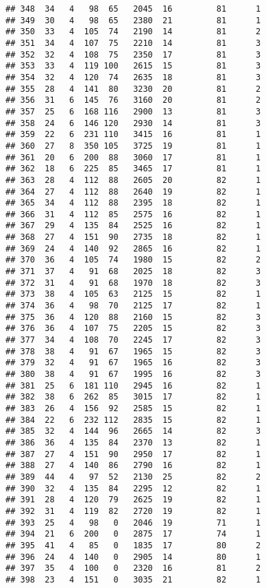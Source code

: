 \documentclass[]{article}
\begin{document}
\begin{verbatim}
## 348  34   4   98  65   2045  16         81      1
## 349  30   4   98  65   2380  21         81      1
## 350  33   4  105  74   2190  14         81      2
## 351  34   4  107  75   2210  14         81      3
## 352  32   4  108  75   2350  17         81      3
## 353  33   4  119 100   2615  15         81      3
## 354  32   4  120  74   2635  18         81      3
## 355  28   4  141  80   3230  20         81      2
## 356  31   6  145  76   3160  20         81      2
## 357  25   6  168 116   2900  13         81      3
## 358  24   6  146 120   2930  14         81      3
## 359  22   6  231 110   3415  16         81      1
## 360  27   8  350 105   3725  19         81      1
## 361  20   6  200  88   3060  17         81      1
## 362  18   6  225  85   3465  17         81      1
## 363  28   4  112  88   2605  20         82      1
## 364  27   4  112  88   2640  19         82      1
## 365  34   4  112  88   2395  18         82      1
## 366  31   4  112  85   2575  16         82      1
## 367  29   4  135  84   2525  16         82      1
## 368  27   4  151  90   2735  18         82      1
## 369  24   4  140  92   2865  16         82      1
## 370  36   4  105  74   1980  15         82      2
## 371  37   4   91  68   2025  18         82      3
## 372  31   4   91  68   1970  18         82      3
## 373  38   4  105  63   2125  15         82      1
## 374  36   4   98  70   2125  17         82      1
## 375  36   4  120  88   2160  15         82      3
## 376  36   4  107  75   2205  15         82      3
## 377  34   4  108  70   2245  17         82      3
## 378  38   4   91  67   1965  15         82      3
## 379  32   4   91  67   1965  16         82      3
## 380  38   4   91  67   1995  16         82      3
## 381  25   6  181 110   2945  16         82      1
## 382  38   6  262  85   3015  17         82      1
## 383  26   4  156  92   2585  15         82      1
## 384  22   6  232 112   2835  15         82      1
## 385  32   4  144  96   2665  14         82      3
## 386  36   4  135  84   2370  13         82      1
## 387  27   4  151  90   2950  17         82      1
## 388  27   4  140  86   2790  16         82      1
## 389  44   4   97  52   2130  25         82      2
## 390  32   4  135  84   2295  12         82      1
## 391  28   4  120  79   2625  19         82      1
## 392  31   4  119  82   2720  19         82      1
## 393  25   4   98   0   2046  19         71      1
## 394  21   6  200   0   2875  17         74      1
## 395  41   4   85   0   1835  17         80      2
## 396  24   4  140   0   2905  14         80      1
## 397  35   4  100   0   2320  16         81      2
## 398  23   4  151   0   3035  21         82      1
\end{verbatim}
\end{document}
